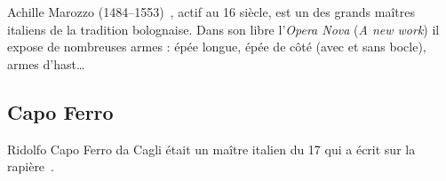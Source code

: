 Achille Marozzo (1484–1553)~\cite{wiktenauer:marozzo}, actif au 16\ieme{} siècle, est un des grands maîtres italiens de la tradition bolognaise.
Dans son libre l'\emph{Opera Nova} (\emph{A new work}) il expose de nombreuses armes : épée longue, épée de côté (avec et sans bocle), armes d'hast…


\subsection{Capo Ferro}
\label{app:maitres:capo_ferro}

Ridolfo Capo Ferro da Cagli était un maître italien du 17\ieme{} qui a écrit sur la rapière~\cite{wiktenauer:capo_ferro}.
